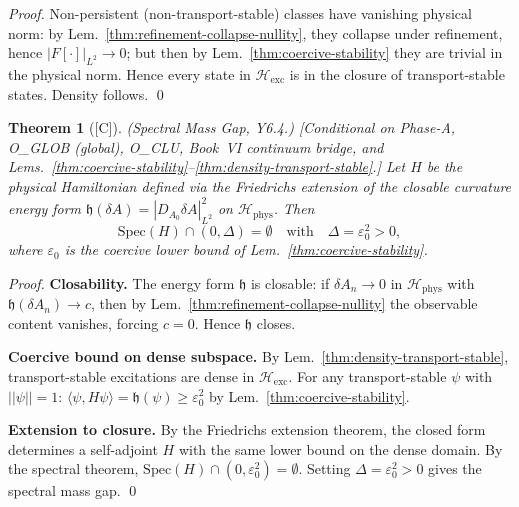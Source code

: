 \documentclass[12pt,oneside]{amsbook}
\theoremstyle{plain}
\newtheorem{theorem}{Theorem}[section]
\theoremstyle{definition}
\theoremstyle{remark}
\newcommand{\status}[1]{\textup{[#1]}}
\begin{document}
\begin{proof}
Non-persistent (non-transport-stable) classes have vanishing
physical norm: by Lem.~\ref{thm:refinement-collapse-nullity},
they collapse under refinement, hence $|F[\cdot]|_{L^2} \to 0$;
but then by Lem.~\ref{thm:coercive-stability} they are trivial
in the physical norm. Hence every state in $\mathcal{H}_{\mathrm{exc}}$
is in the closure of transport-stable states. Density follows. \qed
\end{proof}

\begin{theorem}[\status{C}]\label{thm:spectral-mass-gap}
\textup{(Spectral Mass Gap, Y6.4.)}
\textup{[Conditional on Phase-A, O\_GLOB (global), O\_CLU,
Book~VI continuum bridge, and
Lems.~\ref{thm:coercive-stability}--\ref{thm:density-transport-stable}.]}
Let $H$ be the physical Hamiltonian defined via the Friedrichs
extension of the closable curvature energy form
$\mathfrak{h}(\delta A) = |D_{A_0}\delta A|_{L^2}^2$ on
$\mathcal{H}_{\mathrm{phys}}$. Then
\[
 \mathrm{Spec}(H) \cap (0,\Delta) = \emptyset
 \quad\text{with}\quad \Delta = \varepsilon_0^2 > 0,
\]
where $\varepsilon_0$ is the coercive lower bound of
Lem.~\ref{thm:coercive-stability}.
\end{theorem}

\begin{proof}
\textbf{Closability.} The energy form $\mathfrak{h}$ is closable:
if $\delta A_n \to 0$ in $\mathcal{H}_{\mathrm{phys}}$ with
$\mathfrak{h}(\delta A_n) \to c$, then by
Lem.~\ref{thm:refinement-collapse-nullity} the observable content
vanishes, forcing $c = 0$. Hence $\mathfrak{h}$ closes.

\textbf{Coercive bound on dense subspace.}
By Lem.~\ref{thm:density-transport-stable}, transport-stable
excitations are dense in $\mathcal{H}_{\mathrm{exc}}$. For any
transport-stable $\psi$ with $||\psi||=1$:
$\langle \psi, H\psi \rangle = \mathfrak{h}(\psi) \geq
\varepsilon_0^2$ by Lem.~\ref{thm:coercive-stability}.

\textbf{Extension to closure.}
By the Friedrichs extension theorem, the closed form determines
a self-adjoint $H$ with the same lower bound on the dense domain.
By the spectral theorem, $\mathrm{Spec}(H) \cap (0,\varepsilon_0^2)
= \emptyset$.  Setting $\Delta = \varepsilon_0^2 > 0$ gives the
spectral mass gap. \qed
\end{proof}
\end{document}
